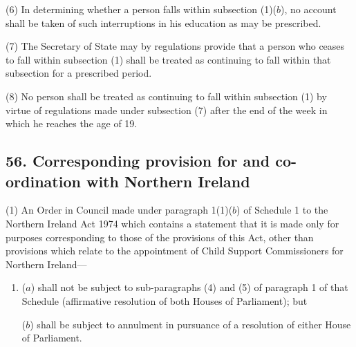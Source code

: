 \documentclass[12pt,a4paper]{article}
\begin{document}
(6) In determining whether a person falls within subsection (1)($b$), no account shall be taken of such interruptions in his education as may be prescribed.

(7) The Secretary of State may by regulations provide that a person who ceases to fall within subsection (1)  shall be treated as continuing to fall within that subsection for a prescribed period.

(8) No person shall be treated as continuing to fall within subsection (1)  by virtue of regulations made under subsection (7)  after the end of the week in which he reaches the age of 19.


\subsection{56. Corresponding provision for and co-ordination with Northern Ireland}

(1) An Order in Council made under paragraph 1(1)($b$)  of Schedule 1 to the Northern Ireland Act 1974 which contains a statement that it is made only for purposes corresponding to those of the provisions of this Act, other than provisions which relate to the appointment of Child Support Commissioners for Northern Ireland—
\begin{enumerate}\item[]
($a$) shall not be subject to sub-paragraphs (4)  and (5)  of paragraph 1 of that Schedule (affirmative resolution of both Houses of Parliament); but

($b$) shall be subject to annulment in pursuance of a resolution of either House of Parliament.
\end{enumerate}

%
%
%
%
\end{document}
